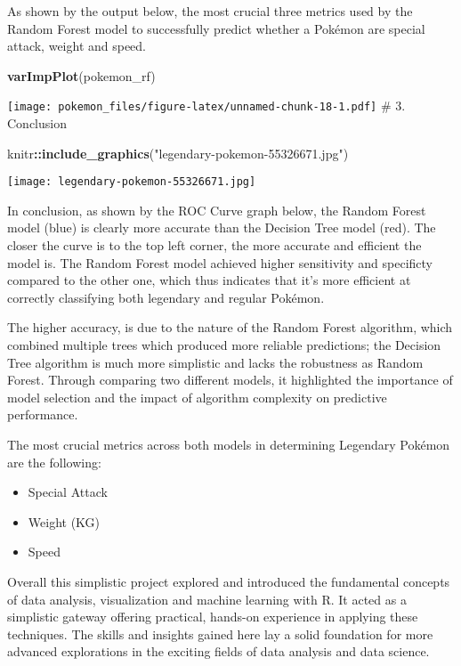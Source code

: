 \documentclass[
]{article}
\newenvironment{Shaded}{\begin{snugshade}}{\end{snugshade}}
\newcommand{\FunctionTok}[1]{\textcolor[rgb]{0.13,0.29,0.53}{\textbf{#1}}}
\newcommand{\NormalTok}[1]{#1}
\newcommand{\SpecialCharTok}[1]{\textcolor[rgb]{0.81,0.36,0.00}{\textbf{#1}}}
\newcommand{\StringTok}[1]{\textcolor[rgb]{0.31,0.60,0.02}{#1}}
\begin{document}
As shown by the output below, the most crucial three metrics used by the
Random Forest model to successfully predict whether a Pokémon are
special attack, weight and speed.

\begin{Shaded}
\begin{Highlighting}[]
\FunctionTok{varImpPlot}\NormalTok{(pokemon\_rf)}
\end{Highlighting}
\end{Shaded}

\texttt{[image: pokemon\_files/figure-latex/unnamed-chunk-18-1.pdf]} \#
3. Conclusion

\begin{Shaded}
\begin{Highlighting}[]
\NormalTok{knitr}\SpecialCharTok{::}\FunctionTok{include\_graphics}\NormalTok{(}\StringTok{"legendary{-}pokemon{-}55326671.jpg"}\NormalTok{)}
\end{Highlighting}
\end{Shaded}

\texttt{[image: legendary-pokemon-55326671.jpg]}

In conclusion, as shown by the ROC Curve graph below, the Random Forest
model (blue) is clearly more accurate than the Decision Tree model
(red). The closer the curve is to the top left corner, the more accurate
and efficient the model is. The Random Forest model achieved higher
sensitivity and specificty compared to the other one, which thus
indicates that it's more efficient at correctly classifying both
legendary and regular Pokémon.

The higher accuracy, is due to the nature of the Random Forest
algorithm, which combined multiple trees which produced more reliable
predictions; the Decision Tree algorithm is much more simplistic and
lacks the robustness as Random Forest. Through comparing two different
models, it highlighted the importance of model selection and the impact
of algorithm complexity on predictive performance.

The most crucial metrics across both models in determining Legendary
Pokémon are the following:

\begin{itemize}
\item
  Special Attack
\item
  Weight (KG)
\item
  Speed
\end{itemize}

Overall this simplistic project explored and introduced the fundamental
concepts of data analysis, visualization and machine learning with R. It
acted as a simplistic gateway offering practical, hands-on experience in
applying these techniques. The skills and insights gained here lay a
solid foundation for more advanced explorations in the exciting fields
of data analysis and data science.
\end{document}
